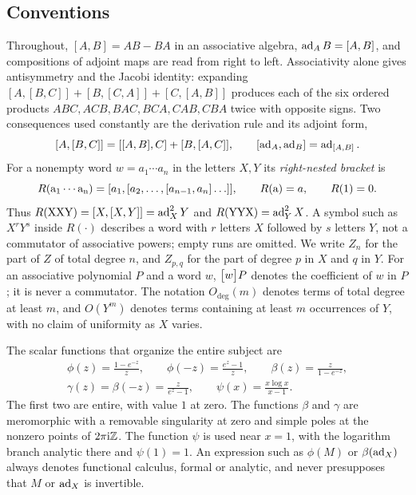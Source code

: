 \subsection{Conventions}
Throughout, $[A,B]=AB-BA$ in an associative algebra, $\operatorname{ad}_AB=[A,B]$, and
compositions of adjoint maps are read from right to left. Associativity alone
gives antisymmetry and the Jacobi identity: expanding
$[A,[B,C]]+[B,[C,A]]+[C,[A,B]]$ produces each of the six ordered products
$ABC,ACB,BAC,BCA,CAB,CBA$ twice with opposite signs. Two consequences used
constantly are the derivation rule and its adjoint form,
\begin{equation}\label{eq:derivation}
 [A,[B,C]]=[[A,B],C]+[B,[A,C]],\qquad [\operatorname{ad}_A,\operatorname{ad}_B]=\operatorname{ad}_{[A,B]}.
\end{equation}
For a nonempty word $w=a_1\cdots a_n$ in the letters $X,Y$ its
\emph{right-nested bracket} is
\begin{equation}\label{eq:rightbracket}
 R(\mathrm{a_1\cdots a_n})=[a_1,[a_2,\ldots,[a_{n-1},a_n]\ldots]],
 \qquad R(\mathrm{a})=a,\qquad R(1)=0.
\end{equation}
Thus $R(\mathrm{XXY})=[X,[X,Y]]=\operatorname{ad}_X^2Y$ and $R(\mathrm{YYX})=\operatorname{ad}_Y^2X$. A symbol such as
$X^rY^s$ inside $R(\cdot)$ describes a word with $r$ letters $X$ followed by
$s$ letters $Y$, not a commutator of associative powers; empty runs are
omitted. We write $Z_n$ for the part of $Z$ of total degree $n$, and $Z_{p,q}$
for the part of degree $p$ in $X$ and $q$ in $Y$. For an associative
polynomial $P$ and a word $w$, $\bigl[w\bigr]P$ denotes the coefficient of $w$ in
$P$; it is never a commutator. The notation $O_{\deg}(m)$ denotes terms of
total degree at least $m$, and $O(Y^m)$ denotes terms containing at least $m$
occurrences of $Y$, with no claim of uniformity as $X$ varies.

The scalar functions that organize the entire subject are
\begin{equation}\label{eq:scalarfunctions}
\begin{gathered}
 \phi(z)=\frac{1-e^{-z}}{z},\qquad
 \phi(-z)=\frac{e^{z}-1}{z},\qquad
 \beta(z)=\frac{z}{1-e^{-z}},\\
 \gamma(z)=\beta(-z)=\frac{z}{e^z-1},\qquad
 \psi(x)=\frac{x\log x}{x-1}.
\end{gathered}
\end{equation}
The first two are entire, with value $1$ at zero. The functions $\beta$ and
$\gamma$ are meromorphic with a removable singularity at zero and simple poles
at the nonzero points of $2\pi\mathrm{i}\mathbb{Z}$. The function $\psi$ is used near $x=1$,
with the logarithm branch analytic there and $\psi(1)=1$. An expression such
as $\phi(M)$ or $\beta(\operatorname{ad}_X)$ always denotes functional calculus, formal or
analytic, and never presupposes that $M$ or $\operatorname{ad}_X$ is invertible.

